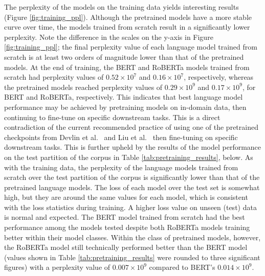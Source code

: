 \documentclass[12pt]{article}
\begin{document}
The perplexity of the models on the training data yields interesting results (Figure \ref{fig:training_ppl}). Although the pretrained models have a
more stable curve over time, the models trained from scratch result in a significantly lower perplexity. Note the difference in the scales on the
y-axis in Figure \ref{fig:training_ppl}; the final perplexity value of each language model trained from scratch is at least two orders of magnitude
lower than that of the pretrained models. At the end of training, the BERT and RoBERTa models trained from scratch had perplexity values of
$0.52\times 10^7$ and $0.16\times 10^7$, respectively, whereas the pretrained models reached perplexity values of $0.29\times 10^9$ and
$0.17\times 10^9$, for BERT and RoBERTa, respectively. This indicates that best language model performance may be achieved by pretraining models on
in-domain data, then continuing to fine-tune on specific downstream tasks. This is a direct contradiction of the current recommended practice of using
one of the pretrained checkpoints from Devlin et al.~\cite{devlin_bert_2019} and Liu et al.~\cite{liu_roberta_2019} then fine-tuning on specific
downstream tasks. This is further upheld by the results of the model performance on the test partition of the corpus in Table
\ref{tab:pretraining_results}, below. As with the training data, the perplexity of the language models trained from scratch over the test partition of
the corpus is significantly lower than that of the pretrained language models. The loss of each model over the test set is somewhat high, but they are
around the same values for each model, which is consistent with the loss statistics during training. A higher loss value on unseen (test) data is
normal and expected. The BERT model trained from scratch had the best performance among the models tested despite both RoBERTa models training better
within their model classes. Within the class of pretrained models, however, the RoBERTa model still technically performed better than the BERT model
(values shown in Table \ref{tab:pretraining_results} were rounded to three significant figures) with a perplexity value of $0.007\times 10^9$ compared
to BERT's $0.014\times 10^9$.
\end{document}
